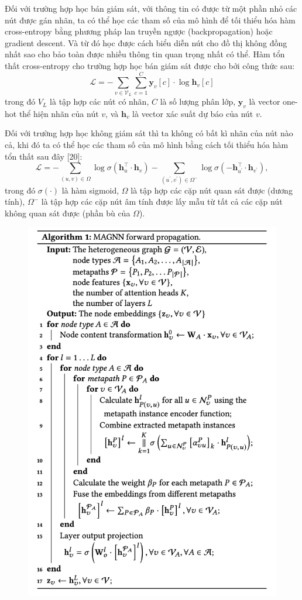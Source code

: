 Đối với trường hợp học bán giám sát, với thông tin có được từ một phần nhỏ các nút được gán nhãn, ta có thể học các tham số của mô hình để tối thiểu hóa hàm cross-entropy bằng phương pháp lan truyền ngược (backpropagation) hoặc gradient descent. Và từ đó học được cách biểu diễn nút cho đồ thị không đồng nhất sao cho bảo toàn được nhiều thông tin quan trọng nhất có thể. Hàm tổn thất cross-entropy cho trường hợp học bán giám sát được cho bởi công thức sau:
\begin{equation}
    \mathcal{L}=-\sum_{v \in \mathcal{V}_{L}} \sum_{c=1}^{C} \mathbf{y}_{v}[c] \cdot \log \mathbf{h}_{v}[c]
\end{equation}
trong đó $V_{L}$ là tập hợp các nút có nhãn, $C$ là số lượng phân lớp, $\mathbf{y}_{v}$ là vector one-hot thể hiện nhãn của nút $v$, và $\mathbf{h}_{v}$ là vector xác suất dự báo của nút $v$.

Đối với trường hợp học không giám sát thì ta không có bất kì nhãn của nút nào cả, khi đó ta có thể học các tham số của mô hình bằng cách tối thiểu hóa hàm tổn thất sau đây [20]:
\begin{equation}
    \mathcal{L}=-\sum_{(u, v) \in \Omega} \log \sigma\left(\mathbf{h}_{u}^{\top} \cdot \mathbf{h}_{v}\right)-\sum_{\left(u^{\prime}, v^{\prime}\right) \in \Omega^{-}} \log \sigma\left(-\mathbf{h}_{u^{\prime}}^{\top} \cdot \mathbf{h}_{v^{\prime}}\right),
\end{equation}
trong đó $\sigma(\cdot)$ là hàm sigmoid, $\Omega$ là tập hợp các cặp nút quan sát được (dương tính), $\Omega^{-}$ là tập hợp các cặp nút âm tính được lấy mẫu từ tất cả các cặp nút không quan sát được (phần bù của $\Omega$).

\begin{figure}
  \includegraphics[width=\columnwidth]{figs/alg1.png}
\end{figure}
